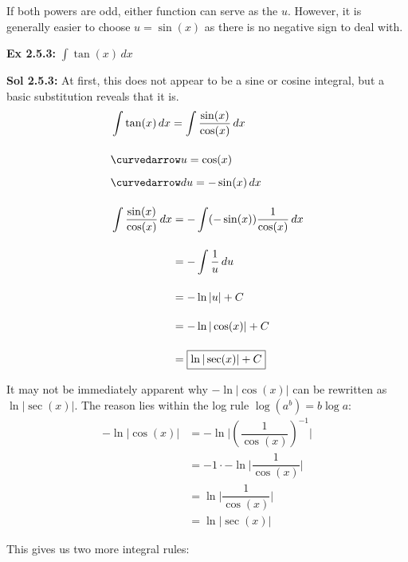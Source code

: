 If both powers are odd, either function can serve as the $u$. However, it is generally easier to choose $u = \sin (x)$ as there is no negative sign to deal with. \par 

\begin{tcolorbox}[example]
    \textbf{Ex 2.5.3: } $\int \tan (x) \, dx$
\end{tcolorbox}
\begin{tcolorbox}[solution]
    \textbf{Sol 2.5.3: } At first, this does not appear to be a sine or cosine integral, but a basic substitution reveals that it is. \begin{align*}
        & \int \tan (x) \, dx = \int \dfrac{\sin (x)}{\cos (x)} \, dx \\[11pt]
        & \curvedarrow u = \cos (x) \\[5.5pt]
        & \curvedarrow du = -\sin (x) \, dx \\[11pt]
        & \int \dfrac{\sin (x)}{\cos (x)} \, dx \begin{aligned}[t]
            & = -\int (-\sin(x))\dfrac{1}{\cos (x)} \, dx \\[11pt]
            & = -\int \dfrac{1}{u} \, du \\[11pt]
            & = -\ln |u| + C \\[11pt]
            & = -\ln |\cos (x)| + C \\[11pt]
            & = \boxed{\ln |\sec (x)| + C}
        \end{aligned}
    \end{align*}
    \begin{tcolorbox}[interesting]
        It may not be immediately apparent why $-\ln |\cos (x)|$ can be rewritten as $\ln |\sec (x)|$. The reason lies within the log rule $\log \left(a^b\right) = b\log a$: \begin{align*}
            -\ln |\cos (x)| &= -\ln \bigg|\left(\dfrac{1}{\cos (x)}\right)^{-1}\bigg| \\[11pt]
            & = -1 \cdot -\ln \bigg|\dfrac{1}{\cos (x)}\bigg| \\[11pt]
            & = \ln \bigg|\dfrac{1}{\cos (x)}\bigg| \\[11pt]
            & = \ln |\sec (x)|
        \end{align*}
    \end{tcolorbox}
\end{tcolorbox}

This gives us two more integral rules: \par

